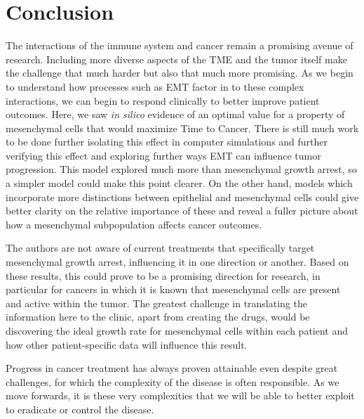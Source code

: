 \documentclass[11pt, a4paper, preprint]{article}
\begin{document}

\section{Conclusion}\label{Conclusion}
The interactions of the immune system and cancer remain a promising avenue of research.
Including more diverse aspects of the TME and the tumor itself make the challenge that much harder but also that much more promising.
As we begin to understand how processes such as EMT factor in to these complex interactions, we can begin to respond clinically to better improve patient outcomes.
Here, we saw {\it in silico} evidence of an optimal value for a property of mesenchymal cells that would maximize Time to Cancer.
There is still much work to be done further isolating this effect in computer simulations and further verifying this effect and exploring further ways EMT can influence tumor progression.
This model explored much more than mesenchymal growth arrest, so a simpler model could make this point clearer.
On the other hand, models which incorporate more distinctions between epithelial and mesenchymal cells could give better clarity on the relative importance of these and reveal a fuller picture about how a mesenchymal subpopulation affects cancer outcomes.

The authors are not aware of current treatments that specifically target mesenchymal growth arrest, influencing it in one direction or another.
%
Based on these results, this could prove to be a promising direction for research, in particular for cancers in which it is known that mesenchymal cells are present and active within the tumor.
The greatest challenge in translating the information here to the clinic, apart from creating the drugs, would be discovering the ideal growth rate for mesenchymal cells within each patient and how other patient-specific data will influence this result.

Progress in cancer treatment has always proven attainable even despite great challenges, for which the complexity of the disease is often responsible. As we move forwards, it is these very complexities that we will be able to better exploit to eradicate or control the disease.


{}

\end{document}

